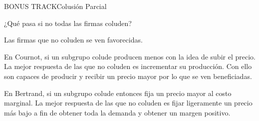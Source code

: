 \documentclass[notes, 11pt]{beamer} %
\newenvironment{wideitemize}{\itemize\addtolength{\itemsep}{10pt}}{\enditemize}
\begin{document}
\begin{frame}{BONUS TRACK}{Colusi\'on Parcial}
\begin{wideitemize}
	\item<1-> ¿Qu\'e pasa si no todas las firmas coluden?
		\begin{wideitemize}
			\item<2->[--] Las firmas que no coluden se ven favorecidas.
			\item<3->[--] En Cournot, si un subgrupo colude producen menos con la idea de subir el precio. La mejor respuesta de las que no coluden es incrementar su producci\'on. Con ello son capaces de producir y recibir un precio mayor por lo que se ven beneficiadas.
			\item<4->[--] En Bertrand, si un subgrupo colude entonces fija un precio mayor al costo marginal. La mejor respuesta de las que no coluden es fijar ligeramente un precio m\'as bajo a fin de obtener toda la demanda y obtener un margen positivo.
		\end{wideitemize}
\end{wideitemize}
\end{frame}


\begin{frame}
\maketitle
\end{frame}
\end{document}
